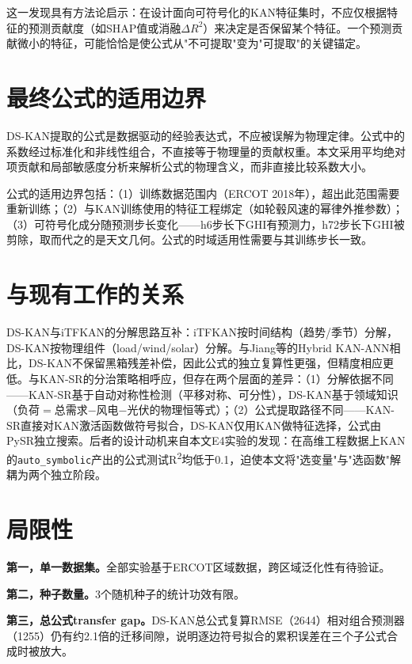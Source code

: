 \documentclass[12pt,a4paper,oneside]{ctexbook}
\begin{document}
这一发现具有方法论启示：在设计面向可符号化的KAN特征集时，不应仅根据特征的预测贡献度（如SHAP值或消融$\Delta R^2$）来决定是否保留某个特征。一个预测贡献微小的特征，可能恰恰是使公式从"不可提取"变为"可提取"的关键锚定。

\section{最终公式的适用边界}

DS-KAN提取的公式是数据驱动的经验表达式，不应被误解为物理定律。公式中的系数经过标准化和非线性组合，不直接等于物理量的贡献权重。本文采用平均绝对项贡献和局部敏感度分析来解析公式的物理含义，而非直接比较系数大小。

公式的适用边界包括：（1）训练数据范围内（ERCOT 2018年），超出此范围需要重新训练；（2）与KAN训练使用的特征工程绑定（如轮毂风速的幂律外推参数）；（3）可符号化成分随预测步长变化——h6步长下GHI有预测力，h72步长下GHI被剪除，取而代之的是天文几何。公式的时域适用性需要与其训练步长一致。

\section{与现有工作的关系}

DS-KAN与iTFKAN\cite{itfkan2025}的分解思路互补：iTFKAN按时间结构（趋势/季节）分解，DS-KAN按物理组件（load/wind/solar）分解。与Jiang等\cite{jiang2024kanann}的Hybrid KAN-ANN相比，DS-KAN不保留黑箱残差补偿，因此公式的独立复算性更强，但精度相应更低。与KAN-SR\cite{buhler2025kansr}的分治策略相呼应，但存在两个层面的差异：（1）分解依据不同——KAN-SR基于自动对称性检测（平移对称、可分性），DS-KAN基于领域知识（负荷$=$总需求$-$风电$-$光伏的物理恒等式）；（2）公式提取路径不同——KAN-SR直接对KAN激活函数做符号拟合，DS-KAN仅用KAN做特征选择，公式由PySR独立搜索。后者的设计动机来自本文E4实验的发现：在高维工程数据上KAN的\texttt{auto\_symbolic}产出的公式测试R\textsuperscript{2}均低于0.1，迫使本文将"选变量"与"选函数"解耦为两个独立阶段。

\section{局限性}

\textbf{第一，单一数据集。}全部实验基于ERCOT区域数据，跨区域泛化性有待验证。

\textbf{第二，种子数量。}3个随机种子的统计功效有限。

\textbf{第三，总公式transfer gap。}DS-KAN总公式复算RMSE（2644）相对组合预测器（1255）仍有约2.1倍的迁移间隙，说明逐边符号拟合的累积误差在三个子公式合成时被放大。
\end{document}

